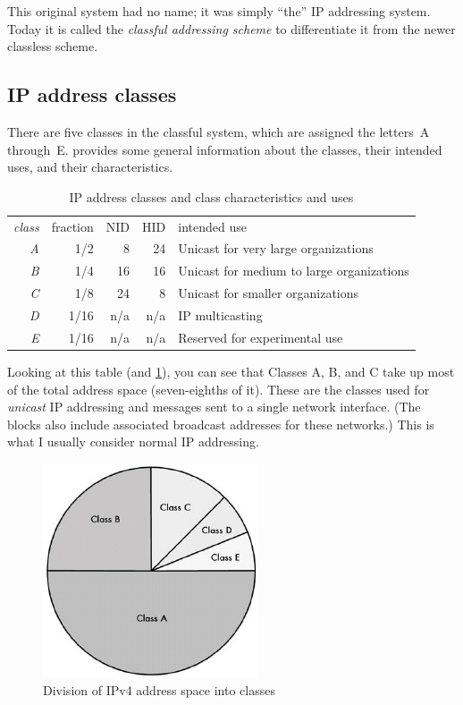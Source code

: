 This original system had no name; it was simply ``the'' IP addressing system.
Today it is called the \emph{classful addressing scheme} to differentiate it from the newer classless scheme.



\subsection{IP address classes}

There are five classes in the classful system, which are assigned the letters~A through~E.
 provides some general information about the classes, their intended uses, and their characteristics.

\begin{table}
   \centering
   \begin{tabular}{rrrrl}
   \textit{class}      & fraction & NID & HID & intended use\\[.75ex]
   \textit{A} & 1/2      & 8   & 24  & Unicast for very large organizations\\
   \textit{B} & 1/4      & 16  & 16  & Unicast for medium to large organizations\\
   \textit{C} & 1/8      & 24  & 8   & Unicast for smaller organizations\\
   \textit{D} & 1/16     & n/a & n/a & IP multicasting\\
   \textit{E} & 1/16     & n/a & n/a & Reserved for experimental use\\
   \end{tabular}
   \caption{IP address classes and class characteristics and uses}
   \label{tab:ip-address-classes}
\end{table}

Looking at this table (and \cref{fig:ipv4-classes}), you can see that Classes A, B, and C take up most of the total address space (seven-eighths of it).
These are the classes used for {\emph{unicast}} IP addressing and messages sent to a single network interface.
(The blocks also include associated broadcast addresses for these networks.)
This is what I usually consider normal IP addressing.


\begin{figure}
   \centering
   \includegraphics[width=.5\textwidth]{images/ipv4-classes.jpg}
   \caption{Division of IPv4 address space into classes}
   \label{fig:ipv4-classes}
\end{figure}

